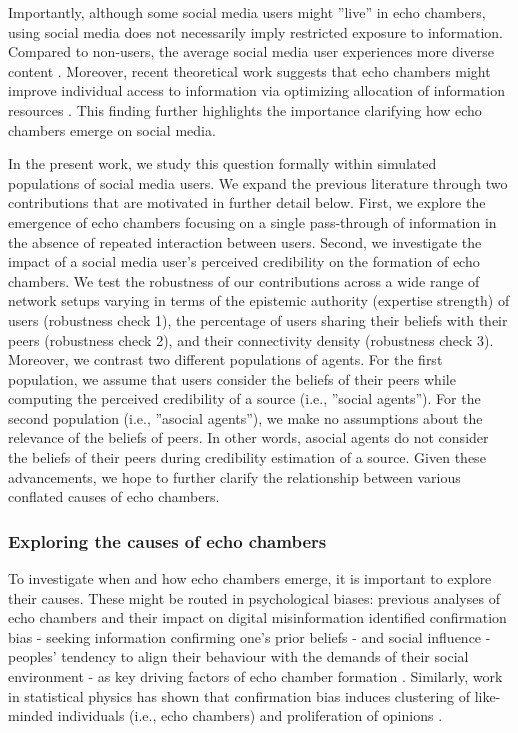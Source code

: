 \documentclass[doc,floatsintext]{apa6}
\begin{document}
Importantly, although some social media users might ''live'' in echo chambers, using social media does not necessarily imply restricted exposure to information. Compared to non-users, the average social media user experiences more diverse content \citep{newman2017reuters}. Moreover, recent theoretical work suggests that echo chambers might improve individual access to information via optimizing allocation of information resources \citep{jann2018echo}. This finding further highlights the importance clarifying how echo chambers emerge on social media. 

In the present work, we study this question formally within simulated populations of social media users. We expand the previous literature through two contributions that are motivated in further detail below. First, we explore the emergence of echo chambers focusing on a single pass-through of information in the absence of repeated interaction between users. Second, we investigate the impact of a social media user's perceived credibility on the formation of echo chambers. We test the robustness of our contributions across a wide range of network setups varying in terms of the epistemic authority (expertise strength) of users (robustness check 1), the percentage of users sharing their beliefs with their peers (robustness check 2), and their connectivity density (robustness check 3). Moreover, we contrast two different populations of agents. For the first population, we assume that users consider the beliefs of their peers while computing the perceived credibility of a source (i.e., ''social agents''). For the second population (i.e., ''asocial agents''), we make no assumptions about the relevance of the beliefs of peers. In other words, asocial agents do not consider the beliefs of their peers during credibility estimation of a source. Given these advancements, we hope to further clarify the relationship between various conflated causes of echo chambers. 

\subsubsection{Exploring the causes of echo chambers}
To investigate when and how echo chambers emerge, it is important to explore their causes. These might be routed in psychological biases: previous analyses of echo chambers and their impact on digital misinformation identified confirmation bias - seeking information confirming one's prior beliefs \citep{nickerson1998confirmation} - and social influence - peoples' tendency to align their behaviour with the demands of their social environment \citep{kelman1958compliance} - as key driving factors of echo chamber formation
\citep{del2016spreading}. Similarly, work in statistical physics has shown that confirmation bias induces clustering of like-minded individuals (i.e., echo chambers) and proliferation of opinions \citep{ngampruetikorn2016bias}. 
\end{document}
